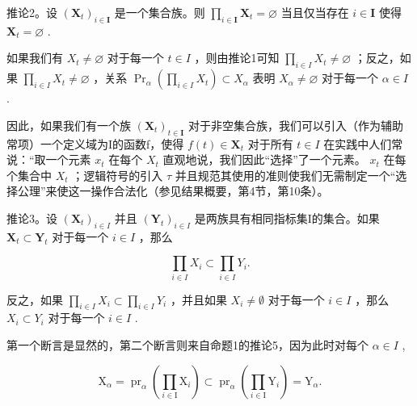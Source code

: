 推论2。设 \((\mathbf{X}_t)_{i \in \mathbf{I}}\) 是一个集合族。则 \(\prod_{i \in \mathbf{I}} \mathbf{X}_t = \varnothing\) 当且仅当存在 \(i \in \mathbf{I}\) 使得 \(\mathbf{X}_t = \varnothing\) .

如果我们有 \(X_{t} \neq \varnothing\) 对于每一个 \(t \in I\) ，则由推论1可知 \(\prod_{i \in I} X_{t} \neq \varnothing\) ；反之，如果 \(\prod_{i \in I} X_{t} \neq \varnothing\) ，关系 \(\Pr_{\alpha}\left(\prod_{i \in I} X_{t}\right) \subset X_{\alpha}\) 表明 \(X_{\alpha} \neq \varnothing\) 对于每一个 \(\alpha \in I\) .

因此，如果我们有一个族 \((\mathbf{X}_{t})_{t\in\mathbf{I}}\) 对于非空集合族，我们可以引入（作为辅助常项）一个定义域为I的函数f，使得 \(f(t)\in\mathbf{X}_{t}\) 对于所有 \(t\in I\) 在实践中人们常说：“取一个元素 \(x_{t}\) 在每个 \(X_{t}\) 直观地说，我们因此“选择”了一个元素。 \(x_{t}\) 在每个集合中 \(X_{t}\) ；逻辑符号的引入 \(\tau\) 并且规范其使用的准则使我们无需制定一个“选择公理”来使这一操作合法化（参见结果概要，第4节，第10条）。

推论3。设 \((\mathbf{X}_t)_{i\in I}\) 并且 \((\mathbf{Y}_t)_{i\in I}\) 是两族具有相同指标集I的集合。如果 \(\mathbf{X}_t\subset \mathbf{Y}_t\) 对于每一个 \(i\in I\) ，那么

\[
\prod_ {i \in I} X _ {i} \subset \prod_ {i \in I} Y _ {i}.
\]

反之，如果 \(\prod_{i\in I}X_i\subset \prod_{i\in I}Y_i\) ，并且如果 \(X_{i}\neq \emptyset\) 对于每一个 \(i\in I\) ，那么 \(X_{i}\subset Y_{i}\) 对于每一个 \(i\in I\) .

第一个断言是显然的，第二个断言则来自命题1的推论5，因为此时对每个 \(\alpha \in I\) ,

\[
\mathrm{X} _ {\alpha} = \operatorname{pr} _ {\alpha} \left(\prod_ {i \in \mathrm{I}} \mathrm{X} _ {i}\right) \subset \operatorname{pr} _ {\alpha} \left(\prod_ {i \in \mathrm{I}} \mathrm{Y} _ {i}\right) = \mathrm{Y} _ {\alpha}.
\]

